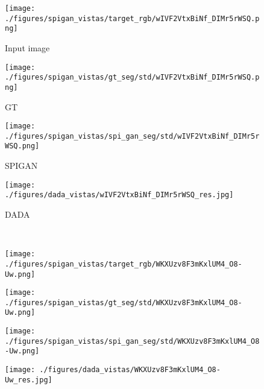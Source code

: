 \documentclass[10pt,twocolumn,letterpaper]{article}
\begin{document}
\begin{figure*}[t!]
	\begin{center}
		\begin{subfigure}[t]{0.24\textwidth}\centering
			\caption{Input image}\vspace{-0.2cm}
			\texttt{[image: ./figures/spigan\_vistas/target\_rgb/wIVF2VtxBiNf\_DIMr5rWSQ.png]}
		\end{subfigure}
		\begin{subfigure}[t]{0.24\textwidth}\centering
			\caption{GT}\vspace{-0.2cm}
			\texttt{[image: ./figures/spigan\_vistas/gt\_seg/std/wIVF2VtxBiNf\_DIMr5rWSQ.png]}
		\end{subfigure}
		\begin{subfigure}[t]{0.24\textwidth}\centering
			\caption{SPIGAN}\vspace{-0.2cm}
			\texttt{[image: ./figures/spigan\_vistas/spi\_gan\_seg/std/wIVF2VtxBiNf\_DIMr5rWSQ.png]}
		\end{subfigure}
		\begin{subfigure}[t]{0.24\textwidth}\centering
			\caption{DADA}\vspace{-0.2cm}
			\texttt{[image: ./figures/dada\_vistas/wIVF2VtxBiNf\_DIMr5rWSQ\_res.jpg]}
		\end{subfigure}\\
		\vspace{0.02cm}
		\hdashrule[1ex][x]{17cm}{1.5pt}{1.5mm}\vspace{-0.13cm}
		\begin{subfigure}[t]{0.24\textwidth}\centering
			\texttt{[image: ./figures/spigan\_vistas/target\_rgb/WKXUzv8F3mKxlUM4\_O8-Uw.png]}
		\end{subfigure}
		\begin{subfigure}[t]{0.24\textwidth}\centering
			\texttt{[image: ./figures/spigan\_vistas/gt\_seg/std/WKXUzv8F3mKxlUM4\_O8-Uw.png]}
		\end{subfigure}
		\begin{subfigure}[t]{0.24\textwidth}\centering
			\texttt{[image: ./figures/spigan\_vistas/spi\_gan\_seg/std/WKXUzv8F3mKxlUM4\_O8-Uw.png]}
		\end{subfigure}
		\begin{subfigure}[t]{0.24\textwidth}\centering
			\texttt{[image: ./figures/dada\_vistas/WKXUzv8F3mKxlUM4\_O8-Uw\_res.jpg]}

\end{subfigure}
\end{center}
\end{figure*}
\end{document}
